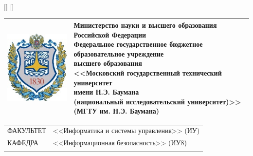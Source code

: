 \StrLen{\RPZTitleStudent}[\StudentLen]
\StrLen{\RPZTitleTeacher}[\TeacherLen]
\ifthenelse{\StudentLen > \TeacherLen}{\StrLen{\RPZTitleStudent}[\SignLen]}{\StrLen{\RPZTitleTeacher}[\SignLen]}

\pagestyle{empty}
\noindent
\begin{tabularx}{\textwidth}{L{2cm} C{\textwidth - 2.7cm}}
    \includegraphics[scale=1]{inc/bmstu.jpg} &
    {\centering\rmfamily\bfseries\fontsize{11pt}{11pt}\selectfont
            Министерство науки и высшего образования Российской Федерации    \\
            Федеральное государственное бюджетное образовательное учреждение \\
            высшего образования                                              \\
            <<Московский государственный технический университет             \\
            имени Н.Э. Баумана                                               \\
            (национальный исследовательский университет)>>                   \\
            (МГТУ им. Н.Э. Баумана)}                                         \\
    \bottomrule[2pt]
    \bottomrule
\end{tabularx}

\noindent
\begin{tabularx}{\textwidth}{lX}
    {\fontsize{12pt}{12pt}\selectfont ФАКУЛЬТЕТ}
                                               &
    {\fontsize{12pt}{12pt}\selectfont <<Информатика и системы управления>> (ИУ)} \\
    \hhline{~~}
    {\fontsize{12pt}{12pt}\selectfont КАФЕДРА} &
    {\fontsize{12pt}{12pt}\selectfont <<Информационная безопасность>> (ИУ8)}     \\
    \hhline{~~}
\end{tabularx}
\vspace{1cm}

